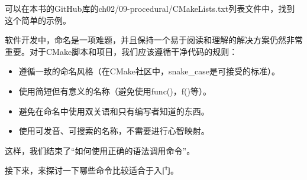 可以在本书的GitHub库的ch02/09-procedural/CMakeLists.txt列表文件中，找到这个简单的示例。


软件开发中，命名是一项难题，并且保持一个易于阅读和理解的解决方案仍然非常重要。对于CMake脚本和项目，我们应该遵循干净代码的规则：

\begin{itemize}
\item
遵循一致的命名风格（在CMake社区中，snake\_case是可接受的标准）。

\item
使用简短但有意义的名称（避免使用func()，f()等）。

\item
避免在命名中使用双关语和只有编写者知道的东西。

\item
使用可发音、可搜索的名称，不需要进行心智映射。
\end{itemize}

这样，我们结束了“如何使用正确的语法调用命令”。

接下来，来探讨一下哪些命令比较适合于入门。



















